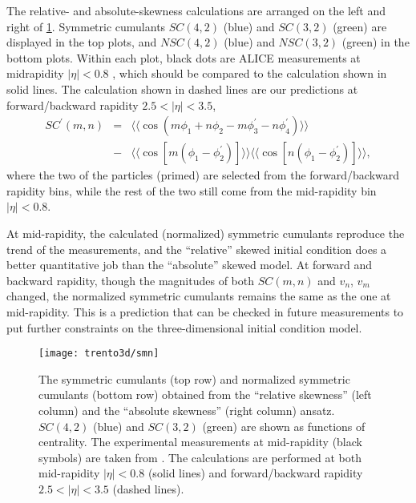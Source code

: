The relative- and absolute-skewness calculations are arranged on the left and right of \ref{fig:trento:smn}. 
Symmetric cumulants $SC(4,2)$ (blue) and $SC(3,2)$ (green) are displayed in the top plots, and $NSC(4,2)$ (blue) and $NSC(3,2)$ (green) in the bottom plots.
Within each plot, black dots are ALICE measurements at midrapidity $|\eta|<0.8$ \cite{ALICE:2016kpq}, which should be compared to the calculation shown in solid lines.
The calculation shown in dashed lines are our predictions at forward/backward rapidity $2.5 < |\eta| < 3.5$,
\begin{eqnarray}
SC^\prime(m, n) &=& \langle\langle \cos(m\phi_1+n\phi_2-m\phi_3^\prime-n\phi_4^\prime)\rangle\rangle \\
\nonumber &-& \langle\langle\cos[m(\phi_1-\phi_2^\prime)]\rangle\rangle\langle\langle\cos[n(\phi_1-\phi_2^\prime)]\rangle\rangle, \label{eq:scmn-diff}
\end{eqnarray}
where the two of the particles (primed) are selected from the forward/backward rapidity bins, while the rest of the two still come from the mid-rapidity bin $|\eta|<0.8$.

At mid-rapidity, the calculated (normalized) symmetric cumulants reproduce the trend of the measurements, and the ``relative'' skewed initial condition does a better quantitative job than the ``absolute'' skewed model.
At forward and backward rapidity, though the magnitudes of both $SC(m,n)$ and $v_n$, $v_m$ changed, the normalized symmetric cumulants remains the same as the one at mid-rapidity.
This is a prediction that can be checked in future measurements to put further constraints on the three-dimensional initial condition model.

\begin{figure}
\singlespacing 
\texttt{[image: trento3d/smn]}
\caption[The symmetric cumulants (top row) and normalized symmetric]{The symmetric cumulants (top row) and normalized symmetric cumulants (bottom row) obtained from the ``relative skewness'' (left column) and the ``absolute skewness'' (right column) ansatz.
$SC(4,2)$ (blue) and $SC(3,2)$ (green) are shown as functions of centrality. The experimental measurements at mid-rapidity (black symbols) are taken from \cite{ALICE:2016kpq}.
The calculations are performed at both mid-rapidity $|\eta|<0.8$ (solid lines) and forward/backward rapidity $2.5<|\eta|<3.5$ (dashed lines).
}
\label{fig:trento:smn} 
\end{figure}

